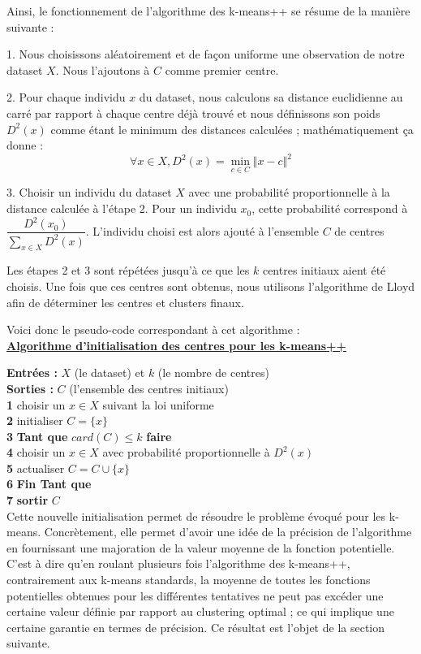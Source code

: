 \documentclass[12pt,a4paper]{book}
\newcommand{\1}{\mathds{1}}
\begin{document}
Ainsi, le fonctionnement de l'algorithme des k-means++ se résume de la manière suivante :
\begin{description}
  \item 1. Nous choisissons aléatoirement et de façon uniforme une observation de notre dataset $X$. Nous l'ajoutons à $C$ comme premier centre.
  \item 2. Pour chaque individu $x$ du dataset, nous calculons sa distance euclidienne au carré par rapport à chaque centre déjà trouvé et nous définissons son poids $D^2(x)$ comme étant le minimum des distances calculées ; mathématiquement ça donne :
  		$$
			\forall x \in X, D^2(x) = \min_{c \in C} \Vert x-c \Vert^2
		$$
  \item 3. Choisir un individu du dataset $X$ avec une probabilité proportionnelle à la distance calculée à l'étape 2. Pour un individu $x_0$, cette probabilité correspond à $\dfrac{D^2(x_0)}{\sum_{x \in X} D^2(x)}$. L'individu choisi est alors ajouté à l'ensemble $C$ de centres
  \end{description}
Les étapes 2 et 3 sont répétées jusqu'à ce que les $k$ centres initiaux aient été choisis. Une fois que ces centres sont obtenus, nous utilisons l'algorithme de Lloyd afin de déterminer les centres et clusters finaux.
  
Voici donc le pseudo-code correspondant à cet algorithme : \\

\noindent \textbf{\underline{Algorithme d'initialisation des centres pour les k-means++}}\label{algo_kmeans_pp}

\noindent \textbf{Entrées : } $X$ (le dataset) et $k$ (le nombre de centres)\\
\noindent \textbf{Sorties : } $C$ (l'ensemble des centres initiaux) \\
\textbf{1} choisir un $x \in X$ suivant la loi uniforme\\
\textbf{2} initialiser $C=\{x\}$\\
\textbf{3} \textbf{Tant que } $card(C) \leq k$ \textbf{faire}\\
\textbf{4} \indent choisir un $x \in X$ avec probabilité proportionnelle à $D^2(x)$\\
\textbf{5} \indent actualiser $C = C \cup \{x \}$\\
\textbf{6} \textbf{Fin Tant que} \\
\textbf{7} \textbf{sortir} $C$ \\

Cette nouvelle initialisation permet de résoudre le problème évoqué pour les k-means. Concrètement, elle permet d'avoir une idée de la précision de l'algorithme en fournissant une majoration de la valeur moyenne de la fonction potentielle. C'est à dire qu'en roulant plusieurs fois l'algorithme des k-means++, contrairement aux k-means standards, la moyenne de toutes les fonctions potentielles obtenues pour les différentes tentatives ne peut pas excéder une certaine valeur définie par rapport au clustering optimal ; ce qui implique une certaine garantie en termes de précision. Ce résultat est l'objet de la section suivante.
\end{document}
